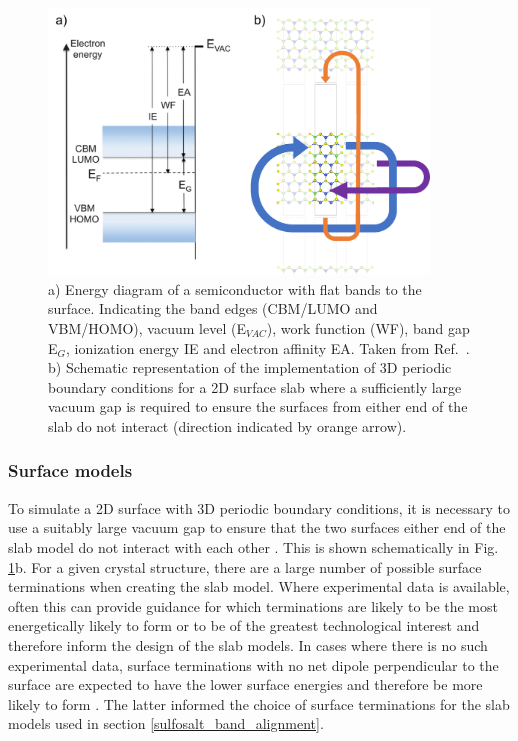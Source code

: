 \documentclass[11pt, twoside]{report}
\begin{document}
\begin{figure}[h!]
  \centering
    \includegraphics[width=0.9\textwidth]{figures/slab_figs.png}
    \caption[a) Energy diagram of a semiconductor with flat bands to the surface. Indicating the band edges (CBM/LUMO and VBM/HOMO), vacuum level (E$_{VAC}$), work function (WF), band gap E$_G$, ionization energy IE and electron affinity EA. b) Schematic representation of the implementation of 3D periodic boundary conditions for a 2D surface slab where a sufficiently large vacuum gap is required to ensure the surfaces from either end of the slab do not interact (direction indicated by orange arrow).]{a) Energy diagram of a semiconductor with flat bands to the surface. Indicating the band edges (CBM/LUMO and VBM/HOMO), vacuum level (E$_{VAC}$), work function (WF), band gap E$_G$, ionization energy IE and electron affinity EA. Taken from Ref.~. b) Schematic representation of the implementation of 3D periodic boundary conditions for a 2D surface slab where a sufficiently large vacuum gap is required to ensure the surfaces from either end of the slab do not interact (direction indicated by orange arrow).}
  \label{slabs}
\end{figure}

\subsubsection{Surface models}
To simulate a 2D surface with 3D periodic boundary conditions, it is necessary to use a suitably large vacuum gap to ensure that the two surfaces either end of the slab model do not interact with each other \cite{Prasad_ch6}. This is shown schematically in Fig. \ref{slabs}b.
For a given crystal structure, there are a large number of possible surface terminations when creating the slab model. Where experimental data is available, often this can provide guidance for which terminations are likely to be the most energetically likely to form or to be of the greatest technological interest and therefore inform the design of the slab models. In cases where there is no such experimental data, surface terminations with no net dipole perpendicular to the surface are expected to have the lower surface energies and therefore be more likely to form \cite{Tasker}. The latter informed the choice of surface terminations for the slab models used in section \ref{sulfosalt_band_alignment}.
\end{document}
